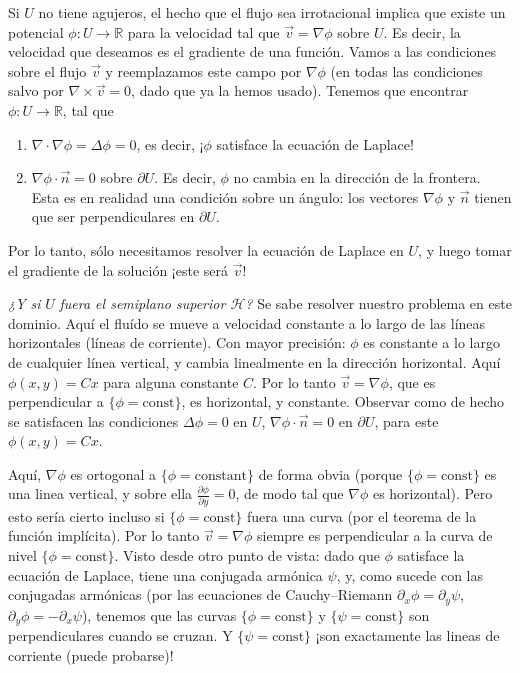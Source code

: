 \documentclass{article}
\newcommand{\realNumbers}{\mathbb{R}}
\newcommand{\upperHalfPlane}{\mathcal{H}}
\theoremstyle{remark}
\begin{document}
  Si \(U\) no tiene agujeros, el hecho que el flujo sea irrotacional implica que existe un potencial \(\phi : U \rightarrow \realNumbers\) para la velocidad tal que \(\vec{v} = \nabla \phi\) sobre \(U\).
  Es decir, la velocidad que deseamos es el gradiente de una función.
  Vamos a las condiciones sobre el flujo \(\vec{v}\) y reemplazamos este campo por \(\nabla \phi\) (en todas las condiciones salvo por \(\nabla \times \vec{v} = 0\), dado que ya la hemos usado).
  Tenemos que encontrar \(\phi : U \rightarrow \realNumbers\), tal que
  \begin{enumerate}
    \item \(\nabla \cdot \nabla \phi = \Delta \phi = 0\), es decir, ¡\(\phi\) satisface la ecuación de Laplace!
    \item \(\nabla \phi \cdot \vec{n} = 0\) sobre \(\partial U\).
    Es decir, \(\phi\) no cambia en la dirección de la frontera.
    Esta es en realidad una condición sobre un ángulo: los vectores \(\nabla \phi\) y \(\vec{n}\) tienen que ser perpendiculares en \(\partial U\).
  \end{enumerate}
  Por lo tanto, sólo necesitamos resolver la ecuación de Laplace en \(U\), y luego tomar el gradiente de la solución
  ¡este será \(\vec{v}\)!

  \emph{¿Y si} \(U\) \emph{fuera el semiplano superior \(\upperHalfPlane\)?}
  Se sabe resolver nuestro problema en este dominio.
  Aquí el fluído se mueve a velocidad constante a lo largo de las líneas horizontales (líneas de corriente).
  Con mayor precisión:
  \(\phi\) es constante a lo largo de cualquier línea vertical, y cambia linealmente en la dirección horizontal.
  Aquí \(\phi(x, y) = C x\) para alguna constante \(C\).
  Por lo tanto \(\vec{v} = \nabla \phi\), que es perpendicular a \(\{\phi = \text{const}\}\), es horizontal, y constante.
  Observar como de hecho se satisfacen las condiciones \(\Delta \phi = 0\) en \(U\), \(\nabla \phi \cdot \vec{n} = 0\) en \(\partial U\), para este \(\phi(x, y) = C x\).

  Aquí, \(\nabla \phi\) es ortogonal a \(\{\phi = \text{constant}\}\) de forma obvia
  (porque \(\{\phi = \text{const}\}\) es una linea vertical, y sobre ella \(\frac{\partial \phi}{\partial y} = 0\), de modo tal que \(\nabla \phi\) es horizontal).
  Pero esto sería cierto incluso si \(\{\phi = \text{const}\}\) fuera una curva (por el teorema de la función implícita).
  Por lo tanto \(\vec{v} = \nabla \phi\) siempre es perpendicular a la curva de nivel \(\{\phi = \text{const}\}\).
  Visto desde otro punto de vista: dado que \(\phi\) satisface la ecuación de Laplace, tiene una conjugada armónica \(\psi\), y, como sucede con las conjugadas armónicas (por las ecuaciones de Cauchy--Riemann \(\partial_x \phi = \partial_y \psi\), \(\partial_y \phi = - \partial_x \psi\)), tenemos que las curvas \(\{\phi = \text{const}\}\) y \(\{\psi = \text{const}\}\) son perpendiculares cuando se cruzan.
  Y \(\{\psi = \text{const}\}\) ¡son exactamente las lineas de corriente (puede probarse)!
\end{document}
